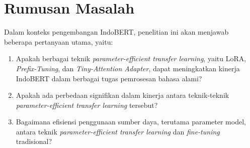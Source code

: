 \section{Rumusan Masalah}

Dalam konteks pengembangan IndoBERT, penelitian ini akan menjawab beberapa pertanyaan utama, yaitu:

\begin{enumerate}
    \item Apakah berbagai teknik \textit{parameter-efficient transfer learning}, yaitu LoRA, \textit{Prefix-Tuning}, dan \textit{Tiny-Attention Adapter}, dapat meningkatkan kinerja IndoBERT dalam berbagai tugas pemrosesan bahasa alami?
    \item Apakah ada perbedaan signifikan dalam kinerja antara teknik-teknik \textit{parameter-efficient transfer learning} tersebut?
    \item Bagaimana efisiensi penggunaan sumber daya, terutama parameter model, antara teknik \textit{parameter-efficient transfer learning} dan \textit{fine-tuning} tradisional?
\end{enumerate}